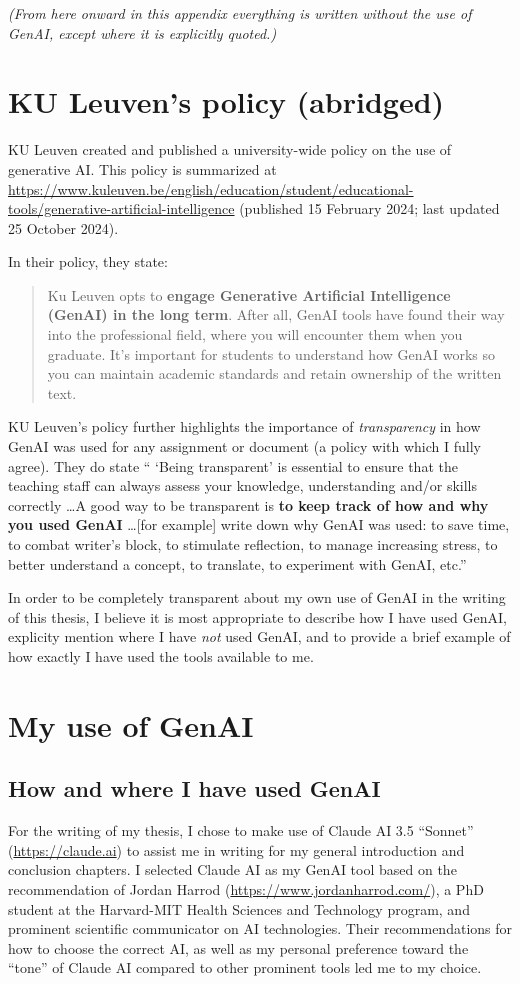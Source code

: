 \textit{(From here onward in this appendix everything is written without the use of GenAI, except where it is explicitly quoted.)}

\section*{KU Leuven's policy (abridged)}
KU Leuven created and published a university-wide policy on the use of generative AI.
This policy is summarized at \url{https://www.kuleuven.be/english/education/student/educational-tools/generative-artificial-intelligence} (published 15 February 2024; last updated 25 October 2024).

In their policy, they state:

\begin{quote}
    Ku Leuven opts to \textbf{engage Generative Artificial Intelligence (GenAI) in the long term}. After all, GenAI tools have found their way into the professional field, where you will encounter them when you graduate. It's important for students to understand how GenAI works so you can maintain academic standards and retain ownership of the written text.
\end{quote}

KU Leuven's policy further highlights the importance of \textit{transparency} in how GenAI was used for any assignment or document (a policy with which I fully agree).
They do state `` `Being transparent' is essential to ensure that the teaching staff can always assess your knowledge, understanding and/or skills correctly \ldots A good way to be transparent is \textbf{to keep track of how and why you used GenAI} \ldots [for example] write down why GenAI was used: to save time, to combat writer's block, to stimulate reflection, to manage increasing stress, to better understand a concept, to translate, to experiment with GenAI, etc.''

In order to be completely transparent about my own use of GenAI in the writing of this thesis, I believe it is most appropriate to describe how I have used GenAI, explicity mention where I have \textit{not} used GenAI, and to provide a brief example of how exactly I have used the tools available to me.

\section*{My use of GenAI}

\subsection*{How and where I have used GenAI}
For the writing of my thesis, I chose to make use of Claude AI 3.5 ``Sonnet'' (\url{https://claude.ai}) to assist me in writing for my general introduction and conclusion chapters.
I selected Claude AI as my GenAI tool based on the recommendation of Jordan Harrod (\url{https://www.jordanharrod.com/}), a PhD student at the Harvard-MIT Health Sciences and Technology program, and prominent scientific communicator on AI technologies.
Their recommendations for how to choose the correct AI, as well as my personal preference toward the ``tone'' of Claude AI compared to other prominent tools led me to my choice.

